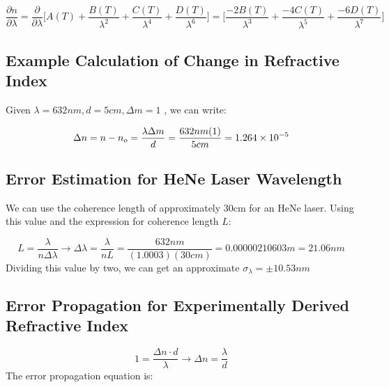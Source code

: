\documentclass{article}
\begin{document}
\begin{equation}
\dfrac{\partial{n}}{\partial{\lambda}} = 
    \dfrac{\partial}{\partial{\lambda}}\bigg[   A(T) + \dfrac{B(T)}{\lambda^2}  + \dfrac{C(T)}{\lambda^4}   + \dfrac{D(T)}{\lambda^6}\bigg] =
    \bigg[   \dfrac{-2B(T)}{\lambda^3}  + \dfrac{-4C(T)}{\lambda^5}   + \dfrac{-6D(T)}{\lambda^7}\bigg]
\end{equation}
\subsection{ Example Calculation of Change in Refractive Index }\label{sec:example_calculation_of_change_in_refractive_index}

Given $\lambda = 632nm, d = 5cm, \Delta{m} = 1$ , we can write:


\begin{equation}
	\Delta{n} =  n - n_o=\frac{\lambda\Delta{m}}{d} = \frac{632nm(1)}{5cm} = \num{1.264d-5}
\end{equation}



\clearpage

\subsection{ Error Estimation for HeNe Laser Wavelength}\label{app:wavelength_error_estimate }\label{sec:error_estimation_for_hene_laser_wavelength}\label{app:wavelength_error_estimate}
We can use the coherence length of approximately 30cm for an HeNe laser. Using this value and the expression for coherence length $L$:

\begin{equation}
	L = \frac{\lambda}{n\Delta\lambda} \rightarrow \Delta\lambda = \frac{\lambda}{nL} = \frac{632nm}{(1.0003)(30cm)} = 0.00000210603m = 21.06nm
\end{equation}Dividing this value by two, we can get an approximate $\sigma_\lambda = \pm 10.53nm$ 




\subsection{ Error Propagation for Experimentally Derived Refractive Index }\label{sec:error_propagation_for_experimentally_derived_refractive_index}

\begin{equation}
	1 = \frac{\Delta{n}\cdot d}{\lambda} \rightarrow \Delta{n} = \frac{\lambda}{d}
\end{equation}The error propagation equation is:
\end{document}
